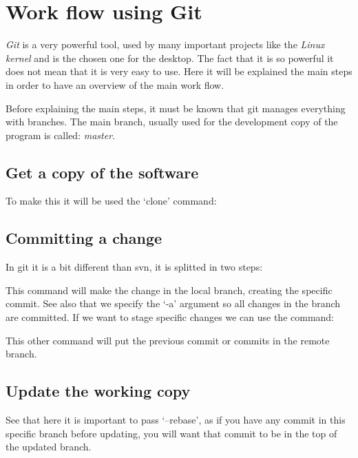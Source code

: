 
\chapter{Work flow using Git}

\emph{Git} is a very powerful tool, used by many important projects like the \emph{Linux kernel} and is the chosen one for the \GNOME desktop. The fact that it is so powerful it does not mean that it is very easy to use. Here it will be explained the main steps in order to have an overview of the main work flow.

Before explaining the main steps, it must be known that git manages everything with branches. The main branch, usually used for the development copy of the program is called: \emph{master}.

\section*{Get a copy of the software}

To make this it will be used the `clone' command:

\noindent{}

\section*{Committing a change}

In git it is a bit different than svn, it is splitted in two steps:

\noindent{}

This command will make the change in the local branch, creating the specific commit. See also that we specify the `-a' argument so all changes in the branch are committed. If we want to stage specific changes we can use the command:

\noindent{}

\noindent{}

This other command will put the previous commit or commits in the remote branch.

\section*{Update the working copy}

\noindent{}

See that here it is important to pass `--rebase', as if you have any commit in this specific branch before updating, you will want that commit to be in the top of the updated branch.

